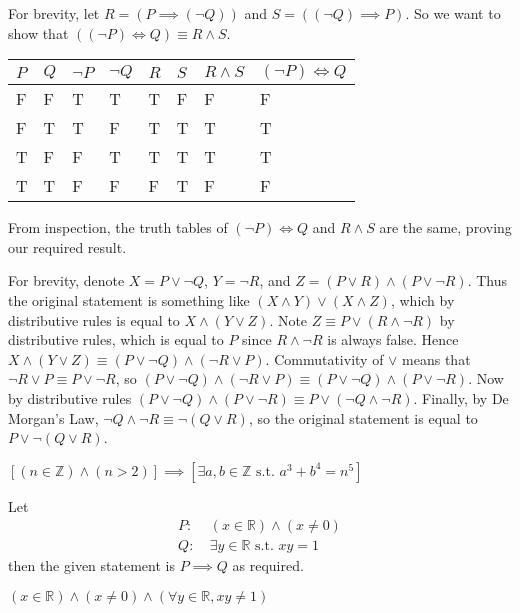 \begin{questions}
    \item For brevity, let $R = (P \implies (\lnot Q))$ and $S = ((\lnot Q) \implies P)$. So we want to show that $((\lnot P) \iff Q) \equiv R \land S$.
    \begin{table}[h]
        \centering
        \begin{tabular}{|l|l||l|l|l|l||l|l|}
            \hline
            $P$ & $Q$ & $\lnot P$ & $\lnot Q$ & $R$ & $S$ & $R \land S$ & $(\lnot P) \iff Q$ \\ \hline
            F   & F   & T         & T         & T   & F   & F           & F                  \\ \hline
            F   & T   & T         & F         & T   & T   & T           & T                  \\ \hline
            T   & F   & F         & T         & T   & T   & T           & T                  \\ \hline
            T   & T   & F         & F         & F   & T   & F           & F                  \\ \hline
        \end{tabular}
    \end{table}

    From inspection, the truth tables of $(\lnot P) \iff Q$ and $R \land S$ are the same, proving our required result.
    
    \item For brevity, denote $X = P \lor \lnot Q$, $Y = \lnot R$, and $Z = (P \lor R) \land (P \lor \lnot R)$. Thus the original statement is something like $(X \land Y) \lor (X \land Z)$, which by distributive rules is equal to $X \land (Y \lor Z)$. Note $Z \equiv P \lor (R \land \lnot R)$ by distributive rules, which is equal to $P$ since $R \land \lnot R$ is always false. Hence $X \land (Y \lor Z) \equiv (P \lor \lnot Q) \land (\lnot R \lor P)$. Commutativity of $\lor$ means that $\lnot R \lor P \equiv P \lor \lnot R$, so $(P \lor \lnot Q) \land (\lnot R \lor P) \equiv (P \lor \lnot Q) \land (P \lor \lnot R)$. Now by distributive rules $(P \lor \lnot Q) \land (P \lor \lnot R) \equiv P \lor (\lnot Q \land \lnot R)$. Finally, by De Morgan's Law, $\lnot Q \land \lnot R \equiv \lnot(Q \lor R)$, so the original statement is equal to $P \lor \lnot(Q \lor R)$.
    
    \item $\left[(n \in \mathbb{Z}) \land (n > 2)\right] \implies \left[\exists a, b \in \mathbb{Z} \text{ s.t. } a^3 + b^4 = n^5\right]$
    
    \item \begin{partquestions}{\roman*}
        \item Let
        \begin{align*}
            P:&\ (x \in \mathbb{R}) \land (x \neq 0)\\
            Q:&\ \exists y \in \mathbb{R} \text{ s.t. } xy = 1
        \end{align*}
        then the given statement is $P \implies Q$ as required.
        \item $(x \in \mathbb{R}) \land (x \neq 0) \land (\forall y \in \mathbb{R}, xy \neq 1)$
    \end{partquestions}
    

\end{questions}
